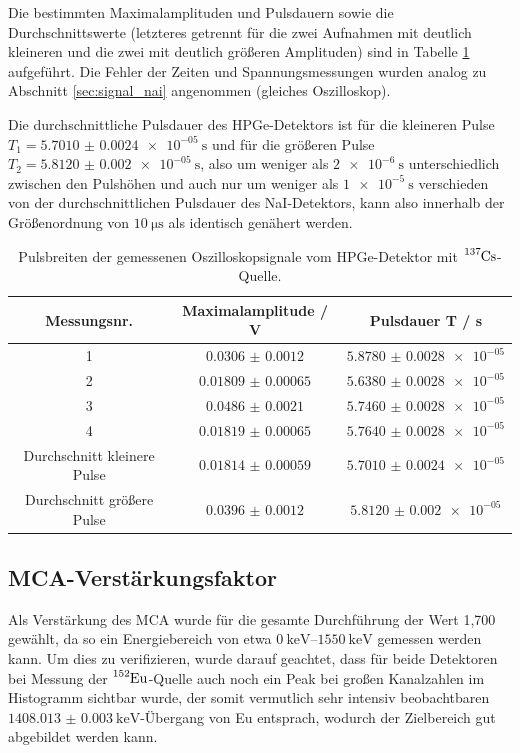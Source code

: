 Die bestimmten Maximalamplituden und Pulsdauern sowie die Durchschnittswerte (letzteres getrennt für die zwei Aufnahmen mit deutlich kleineren und die zwei mit deutlich größeren Amplituden) sind in Tabelle \ref{tab:pulsedurations_ge} aufgeführt. Die Fehler der Zeiten und Spannungsmessungen wurden analog zu Abschnitt \ref{sec:signal_nai} angenommen (gleiches Oszilloskop).

Die durchschnittliche Pulsdauer des HPGe-Detektors ist für die kleineren Pulse $T_1=\SI{5.7010(24)e-05}{\second}$ und für die größeren Pulse $T_2=\SI{5.8120(20)e-05}{\second}$, also um weniger als $\SI{2e-6}{\second}$ unterschiedlich zwischen den Pulshöhen und auch nur um weniger als $\SI{1e-5}{\second}$ verschieden von der durchschnittlichen Pulsdauer des NaI-Detektors, kann also innerhalb der Größenordnung von $\SI{10}{\micro \second}$ als identisch genähert werden.

\begin{table}[h]
    \centering
    \begin{tabular}{|c|c|c|} \hline
    Messungsnr. & Maximalamplitude / V & Pulsdauer T / s  \\
    \hline
    1 & $\num{0.0306(12)}$ & $\num{5.8780(28)e-05}$ \\
    2 & $\num{0.01809(65)}$ & $\num{5.6380(28)e-05}$ \\
    3 & $\num{0.0486(21)}$ & $\num{5.7460(28)e-05}$ \\
    4 & $\num{0.01819(65)}$ & $\num{5.7640(28)e-05}$ \\ \hline
    Durchschnitt kleinere Pulse & $\num{0.01814(59)}$ & $\num{5.7010(24)e-05}$ \\
    \hline
    Durchschnitt größere Pulse & $\num{0.0396(12)}$ & $\num{5.8120(20)e-05}$ \\ \hline
    \end{tabular}
    \caption{Pulsbreiten der gemessenen Oszilloskopsignale vom HPGe-Detektor mit $\ce{ ^137Cs }$-Quelle.}
    \label{tab:pulsedurations_ge}
\end{table}

\subsection{MCA-Verstärkungsfaktor} \label{sec:verstaerkung}
Als Verstärkung des MCA wurde für die gesamte Durchführung der Wert 1,700 gewählt, da so ein Energiebereich von etwa $\SIrange{0}{1550}{\kilo\eV}$ gemessen werden kann. Um dies zu verifizieren, wurde darauf geachtet, dass für beide Detektoren bei Messung der $\ce{ ^152Eu }$-Quelle auch noch ein Peak bei großen Kanalzahlen im Histogramm sichtbar wurde, der somit vermutlich sehr intensiv beobachtbaren $\SI{1408.013(3)}{\kilo\eV}$-Übergang von Eu \cite[8]{521versuchsanleitung} entsprach, wodurch der Zielbereich gut abgebildet werden kann.
